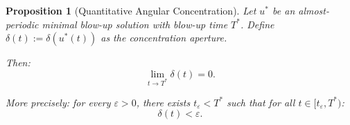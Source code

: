 \documentclass[11pt]{article}
\newtheorem{proposition}[theorem]{Proposition}
\theoremstyle{definition}
\begin{document}
\begin{proposition}[Quantitative Angular Concentration]\label{prop:ap-concentration}
Let $u^*$ be an almost-periodic minimal blow-up solution with blow-up time $T^*$. Define $\delta(t) := \delta(u^*(t))$ as the concentration aperture.

Then:
\begin{equation}
\lim_{t \to T^*} \delta(t) = 0.
\end{equation}

More precisely: for every $\varepsilon > 0$, there exists $t_\varepsilon < T^*$ such that for all $t \in [t_\varepsilon, T^*)$:
\begin{equation}
\delta(t) < \varepsilon.
\end{equation}
\end{proposition}
\end{document}
